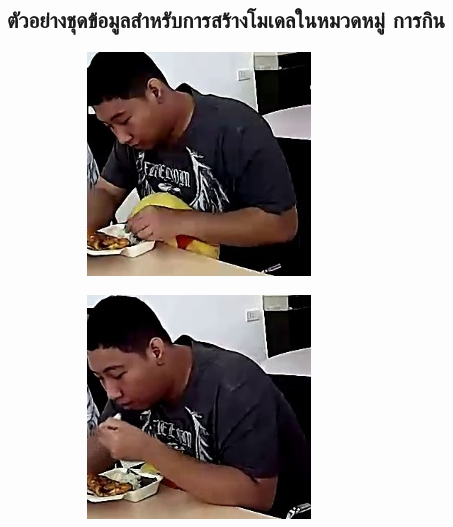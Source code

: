 \clearpage
\subsection*{ตัวอย่างชุดข้อมูลสำหรับการสร้างโมเดลในหมวดหมู่ การกิน }
\begin{figure}[!ht]
    \centering
   \begin{subfigure}[b]{0.45\linewidth}
      \includegraphics[width=\linewidth]{appendix/eat/000_CXS1_D0_000455.jpg}
    \end{subfigure}
    \begin{subfigure}[b]{0.45\linewidth}
      \includegraphics[width=\linewidth]{appendix/eat/000_CXS1_D0_001035.jpg}

\end{subfigure}
\end{figure}
